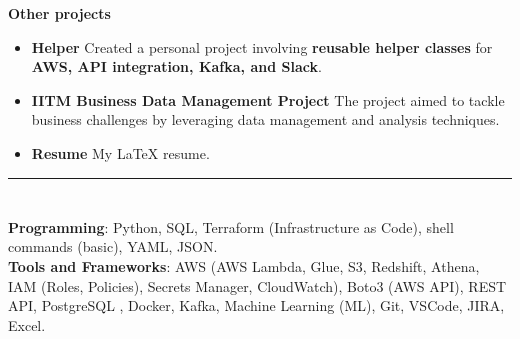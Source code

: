 \documentclass[a4paper,10pt]{article}
\begin{document}
\vspace{-2mm}
\textbf{Other projects}
\vspace{-2mm}
\begin{itemize}
    \item \textbf{Helper} \href{https://github.com/ShreehariA/helpers}{} Created a personal project involving \textbf{reusable helper classes} for \textbf{AWS, API integration, Kafka, and Slack}.
    \vspace{-6mm}
    \item \textbf{IITM Business Data Management  Project} \href{https://github.com/ShreehariA/IITM_BDM_Project}{} The project aimed to tackle business challenges by leveraging data management and analysis techniques.
    \vspace{-2mm}
    \item \textbf{Resume} \href{https://github.com/ShreehariA/Resume}{} My LaTeX resume.
\end{itemize}

\hrule
\vspace{-4mm}
\section{\scshape\color{Fuchsia}{\faTools\ \textbf TECHNICAL SKILLS}}
\textbf{Programming}: Python, SQL, Terraform (Infrastructure as Code), shell commands (basic), YAML, JSON. \\
\textbf{Tools and Frameworks}: AWS (AWS Lambda, Glue, S3, Redshift, Athena, IAM (Roles, Policies), Secrets Manager, CloudWatch), Boto3 (AWS API), REST API, PostgreSQL
, Docker, Kafka, Machine Learning (ML), Git, VSCode, JIRA, Excel.
\end{document}
